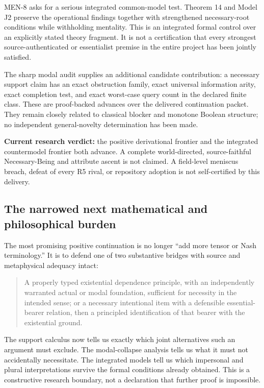 \documentclass[11pt,a4paper]{article}
\begin{document}
MEN-8 asks for a serious integrated common-model test. Theorem 14 and
Model J2 preserve the operational findings together with strengthened
necessary-root conditions while withholding mentality. This is an
integrated formal control over an explicitly stated theory fragment. It
is not a certification that every strongest source-authenticated or
essentialist premise in the entire project has been jointly satisfied.

The sharp modal audit supplies an additional candidate contribution: a
necessary support claim has an exact obstruction family, exact universal
information arity, exact completion test, and exact worst-case query
count in the declared finite class. These are proof-backed advances over
the delivered continuation packet. They remain closely related to
classical blocker and monotone Boolean structure; no independent
general-novelty determination has been made.

\textbf{Current research verdict:} the positive derivational frontier
and the integrated countermodel frontier both advance. A complete
world-directed, source-faithful Necessary-Being and attribute ascent is
not claimed. A field-level meniscus breach, defeat of every R5 rival, or
repository adoption is not self-certified by this delivery.

\subsection{The narrowed next mathematical and philosophical
burden}\label{the-narrowed-next-mathematical-and-philosophical-burden}

The most promising positive continuation is no longer ``add more tensor
or Nash terminology.'' It is to defend one of two substantive bridges
with source and metaphysical adequacy intact:

\begin{quote}
A properly typed existential dependence principle, with an independently
warranted actual or modal foundation, sufficient for necessity in the
intended sense; or a necessary intentional item with a defensible
essential-bearer relation, then a principled identification of that
bearer with the existential ground.
\end{quote}

The support calculus now tells us exactly which joint alternatives such
an argument must exclude. The modal-collapse analysis tells us what it
must not accidentally necessitate. The integrated models tell us which
impersonal and plural interpretations survive the formal conditions
already obtained. This is a constructive research boundary, not a
declaration that further proof is impossible.
\end{document}
